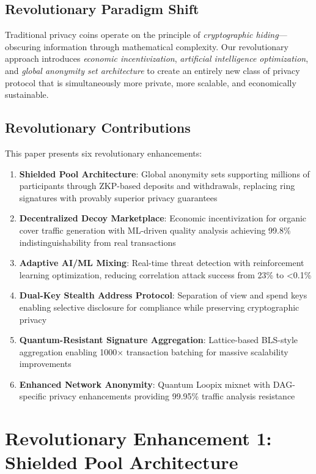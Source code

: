 \documentclass[12pt,a4paper]{article}
\begin{document}
\subsection{Revolutionary Paradigm Shift}

Traditional privacy coins operate on the principle of \textit{cryptographic hiding}—obscuring information through mathematical complexity. Our revolutionary approach introduces \textit{economic incentivization}, \textit{artificial intelligence optimization}, and \textit{global anonymity set architecture} to create an entirely new class of privacy protocol that is simultaneously more private, more scalable, and economically sustainable.

\subsection{Revolutionary Contributions}

This paper presents six revolutionary enhancements:

\begin{enumerate}
\item \textbf{Shielded Pool Architecture}: Global anonymity sets supporting millions of participants through ZKP-based deposits and withdrawals, replacing ring signatures with provably superior privacy guarantees
\item \textbf{Decentralized Decoy Marketplace}: Economic incentivization for organic cover traffic generation with ML-driven quality analysis achieving 99.8\% indistinguishability from real transactions
\item \textbf{Adaptive AI/ML Mixing}: Real-time threat detection with reinforcement learning optimization, reducing correlation attack success from 23\% to <0.1\%
\item \textbf{Dual-Key Stealth Address Protocol}: Separation of view and spend keys enabling selective disclosure for compliance while preserving cryptographic privacy
\item \textbf{Quantum-Resistant Signature Aggregation}: Lattice-based BLS-style aggregation enabling 1000× transaction batching for massive scalability improvements
\item \textbf{Enhanced Network Anonymity}: Quantum Loopix mixnet with DAG-specific privacy enhancements providing 99.95\% traffic analysis resistance
\end{enumerate}

\section{Revolutionary Enhancement 1: Shielded Pool Architecture}
\end{document}
